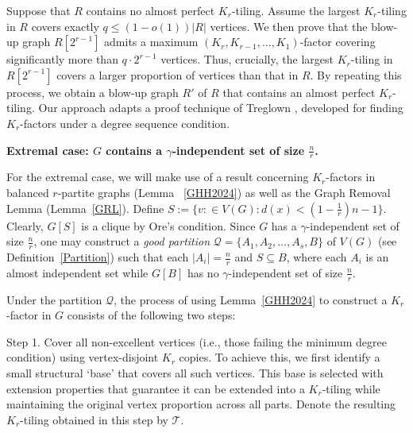 \documentclass[11pt, a4paper]{article}
\theoremstyle{definition}
\newcommand{\<}{\subseteq}
\begin{document}
Suppose that $R$ contains no almost perfect $K_r$-tiling. Assume the largest
$K_r$-tiling in $R$ covers exactly  $q\leq (1-o(1))|R|$  vertices. We then prove that the blow-up graph  $R[2^{r-1}]$ admits a maximum $(K_r, K_{r-1}, \ldots, K_1)$-factor covering significantly more than $q \cdot 2^{r-1}$ vertices. 
Thus,
crucially, the largest $K_r$-tiling in $R[2^{r-1}]$ covers a larger proportion of vertices than that in $R$. By repeating this process, we obtain a blow-up graph $R'$ of $R$ that
contains an almost perfect $K_r$-tiling.  Our approach adapts a proof technique of Treglown \cite{Treg2016}, developed for finding $K_r$-factors under a degree sequence condition.%

\medskip
\textbf{ Extremal case: $G$ contains a $\gamma$-independent set of size $\frac{n}{r}$.}
\medskip



 
 




For the extremal case, we will make use of a result %
concerning $K_r$-factors in balanced $r$-partite graphs (Lemma~ \ref{GHH2024}) as well as the Graph Removal Lemma  (Lemma~\ref{GRL}). 
Define $S:=\{v:\in V(G):d(x)<(1-\frac{1}{r})n-1\}$. Clearly, $G[S]$ is a clique by Ore's condition. Since $G$ has a $\gamma$-independent set of size $\frac{n}{r}$, one may construct a \textit{good partition} $\mathcal{Q}=\{A_1,A_2,\ldots,A_s,B\}$ of $V(G)$ (see Definition~\ref{Partition}) such that each $|A_i|=\frac{n}{r}$ and $S\subseteq B$, where each $A_i$ is an almost independent set while $G[B]$ has no $\gamma$-independent set of size $\frac{n}{r}$. %

Under the partition $\mathcal{Q}$, the process of using Lemma~\ref{GHH2024} to construct a $K_r$-factor in $G$ consists of the following two steps:

Step 1. Cover all non-excellent vertices (i.e., those failing the minimum degree condition) using vertex-disjoint $K_r$ copies. To achieve this, we first identify a small structural `base' that covers all such vertices. This base is selected with extension properties that guarantee it can be extended into a $K_r$-tiling while maintaining the original vertex proportion across all parts. Denote the resulting $K_r$-tiling obtained in this step by $\mathcal{T}$. 
\end{document}
